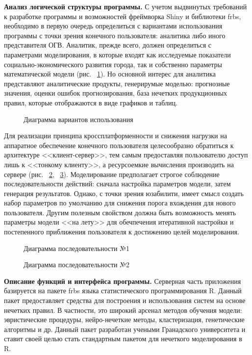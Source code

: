 \textbf{Анализ логической структуры программы.}
С учетом выдвинутых требований к разработке программы и возможностей фреймворка
Shiny и библиотеки frbs, необходимо в первую очередь определиться с вариантами
использования программы с точки зрения конечного пользователя: аналитика либо
иного представителя ОГВ. Аналитик, прежде всего, должен определиться с
параметрами моделирования, в которые входят как исследуемые показатели
социально-экономического развития города, так и собственно параметры
математической модели (рис. ~\ref{figure:usecase1}). Но основной интерес для
аналитика представляют аналитические продукты, генерирумые моделью: прогнозные
значения, оценки ошибок прогнозирования, база нечетких продукционных правил,
которые отображаются в виде графиков и таблиц.
\begin{figure}[bhtp]
    \caption{Диаграмма вариантов использования}		
    \label{figure:usecase1}
\end{figure}
Для реализации принципа кроссплатформенности и снижения нагрузки на аппаратное
обеспечение конечного пользователя целесообразно обратиться к архитектуре
<<клиент-сервер>>, тем самым предоставляя пользователю доступ лишь к <<тонкому
клиенту>>, а ресурсоемкие вычисления производить на сервере (рис.
~\ref{figure:sequence1}, ~\ref{figure:sequence2}). Моделирование предполагает
строгое соблюдение последовательности действий: сначала настройка параметров
модели, затем генерация результатов. Однако, с точки зрения юзабилити, имеет
смысл создать набор параметров по умолчанию для снижения порога вхождения для
нового пользователя. Другим полезным свойством должна быть возможность менять
параметры модели <<на лету>> для обечпечения итеративной настройки и
постепенного приближения пользователя к достижению целей моделирования.
\begin{figure}[bhtp]
    \caption{Диаграмма последовательности №1}		
    \label{figure:sequence1}
\end{figure}

\begin{figure}[bhtp]
    \caption{Диаграмма последовательности №2}		
    \label{figure:sequence2}
\end{figure}

\textbf{Описание функций  и интерфейса программы.}
Серверная часть приложения базируется на пакете frbs языка статистического
программирования R. Данный пакет предоставляет средства для построения
и использования систем на основе нечетких правил. В частности, это широкий
арсенал методов обучения модели: эвристические процедуры, нейро-нечеткие методы,
кластеризация, генетические алгоритмы и др. Данный пакет разработан учеными
Гранадского университета и ставит своей целью стать стандартным пакетом для
нечеткого моделирования в R.

